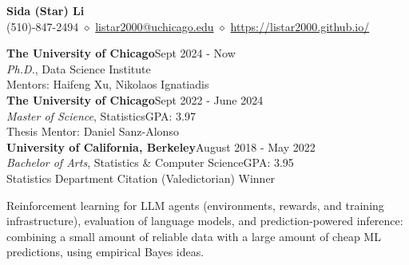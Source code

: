 \documentclass[10pt,letterpaper]{article}
\newlength{\labw}\setlength{\labw}{1.15in}
\newenvironment{sect}[1]{%
  \begin{list}{}{\setlength{\leftmargin}{\labw}\setlength{\labelwidth}{\labw}%
  \setlength{\labelsep}{0pt}\setlength{\itemsep}{0pt}\setlength{\topsep}{0pt}\setlength{\parsep}{0pt}}%
  \item[{\raisebox{0pt}[0pt][0pt]{\parbox[t]{\labw}{\bfseries\raggedright\MakeUppercase{#1}}}}]}%
  {\end{list}\vspace{1.1em}}
\newcommand{\entry}[2]{\textbf{#1}\hfill #2\\}
\begin{document}
\sloppy
\begin{center}
{\Huge\bfseries Sida (Star) Li}\\[3pt]
(510)-847-2494 $\diamond$ \href{mailto:listar2000@uchicago.edu}{listar2000@uchicago.edu} $\diamond$ \href{https://listar2000.github.io/}{https://listar2000.github.io/}
\end{center}
\vspace{0.6em}

\begin{sect}{Education}
\entry{The University of Chicago}{Sept 2024 - Now}
\textit{Ph.D.}, Data Science Institute\\
Mentors: Haifeng Xu, Nikolaos Ignatiadis\\
\entry{The University of Chicago}{Sept 2022 - June 2024}
\textit{Master of Science}, Statistics\hfill GPA: 3.97\\
Thesis Mentor: Daniel Sanz-Alonso\\
\entry{University of California, Berkeley}{August 2018 - May 2022}
\textit{Bachelor of Arts}, Statistics \& Computer Science\hfill GPA: 3.95\\
Statistics Department Citation (Valedictorian) Winner
\end{sect}

\begin{sect}{Research\\Interests}
Reinforcement learning for LLM agents (environments, rewards, and training infrastructure), evaluation of language models, and prediction-powered inference: combining a small amount of reliable data with a large amount of cheap ML predictions, using empirical Bayes ideas.
\end{sect}
\end{document}
